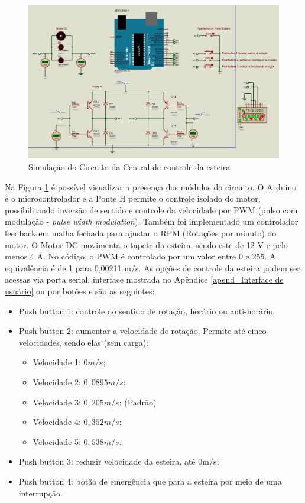         \begin{figure}[h]
           \centering
           \includegraphics[width=1\textwidth]{imagens/EsquemaDoCirtuitoDaCentralDeControle.png}
           \caption{Simulação do Circuito da Central de controle da esteira}
          \label{fig:EsquemaDoCirtuitoDaCentralDeControle}
        \end{figure}
    
    Na Figura \ref{fig:EsquemaDoCirtuitoDaCentralDeControle} é possível visualizar a presença dos módulos do circuito. O Arduino é o microcontrolador e a Ponte H permite o controle isolado do motor, possibilitando inversão de sentido e controle da velocidade por PWM (pulso com modulação - \textit{pulse width modulation}). Também foi implementado um controlador feedback em malha fechada para ajustar o RPM (Rotações por minuto) do motor.  O Motor DC movimenta o tapete da esteira, sendo este de 12 V e pelo menos 4 A. No código, o PWM é controlado por um valor entre 0 e 255. A equivalência é de 1 para 0,00211 m/s. As opções de controle da esteira podem ser acessas via porta serial, interface mostrada no Apêndice \ref{apend_Interface de usuário} ou por botões e são as seguintes:
    
    

\begin{itemize}
    \item Push button 1: controle do sentido de rotação, horário ou anti-horário;
    \item Push button 2: aumentar a velocidade de rotação. Permite até cinco velocidades, sendo elas (sem carga):
    \begin{itemize}
        \item Velocidade 1: $0m/s$; 
        \item Velocidade 2: $0,0895m/s$; 
        \item Velocidade 3: $0,205m/s$; (Padrão)
        \item Velocidade 4: $0,352m/s$;
        \item Velocidade 5: $0,538m/s$.
    \end{itemize}
    \item Push button 3: reduzir velocidade da esteira, até 0m/s;
    \item Push button 4: botão de emergência que para a esteira por meio de uma interrupção.
\end{itemize}

